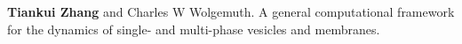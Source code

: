 
\begin{cventries}

  \cventry
    {} %
    {} %
    {} %
    {} %
    {
      \begin{cvitems} %
      	\item {\textbf{Tiankui Zhang} and Charles W Wolgemuth. A general computational framework for the dynamics of single- and multi-phase vesicles and membranes.}
      \end{cvitems}
    }
\end{cventries}